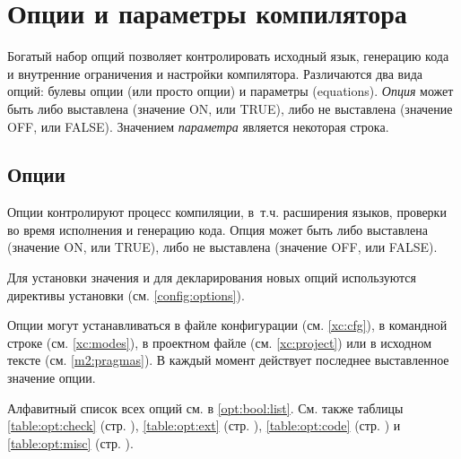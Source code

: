 

\newcommand{\MLBegin}{\ifonline {\bf Режимы:} \else [\fi}
\newcommand{\MLEnd}{\ifonline \else ]\fi}
\newcommand{\ModeC}{\ifonline \ref[COMPILE]{xc:modes:compile}\else compile\fi}
\newcommand{\ModeM}{\ifonline \ref[MAKE]{xc:modes:make}\else make\fi}
\newcommand{\ModeP}{\ifonline \ref[PROJECT]{xc:modes:project}\else project\fi}
\newcommand{\ModeB}{\ifonline \ref[BROWSE]{xc:modes:browse}\else browse\fi}
\newcommand{\ModeG}{\ifonline \ref[GEN]{xc:modes:gen}\else gen\fi}

\chapter{Опции и параметры компилятора}\label{options}

Богатый набор опций \xds{} позволяет контролировать исходный язык, 
генерацию кода и внутренние ограничения и настройки компилятора.
Различаются два вида опций: булевы опции (или просто опции) и параметры
(equations).
{\em Опция} может быть либо выставлена (значение ON, или TRUE), 
либо не выставлена (значение OFF, или FALSE). 
Значением {\em параметра} является некоторая строка.

\section{Опции}\label{opt:bool}

Опции контролируют процесс компиляции, в~т.ч. расширения языков,
проверки во время исполнения и генерацию кода. Опция может быть 
либо выставлена (значение ON, или TRUE), 
либо не выставлена (значение OFF, или FALSE). 

Для установки значения и для декларирования новых опций
используются директивы установки (см. \ref{config:options}).

Опции могут устанавливаться в файле конфигурации
(см. \ref{xc:cfg}), в командной строке
(см. \ref{xc:modes}), в проектном файле (см.
\ref{xc:project}) или в исходном тексте (см. \ref{m2:pragmas}). 
В каждый момент действует последнее выставленное значение опции.

Алфавитный список всех опций см. в \ref{opt:bool:list}.
\ifonline\else
См. также таблицы
\ref{table:opt:check} (стр. \pageref{table:opt:check}),
\ref{table:opt:ext}   (стр. \pageref{table:opt:ext}),
\ref{table:opt:code}  (стр. \pageref{table:opt:code})
и
\ref{table:opt:misc}  (стр. \pageref{table:opt:misc}).
\fi


